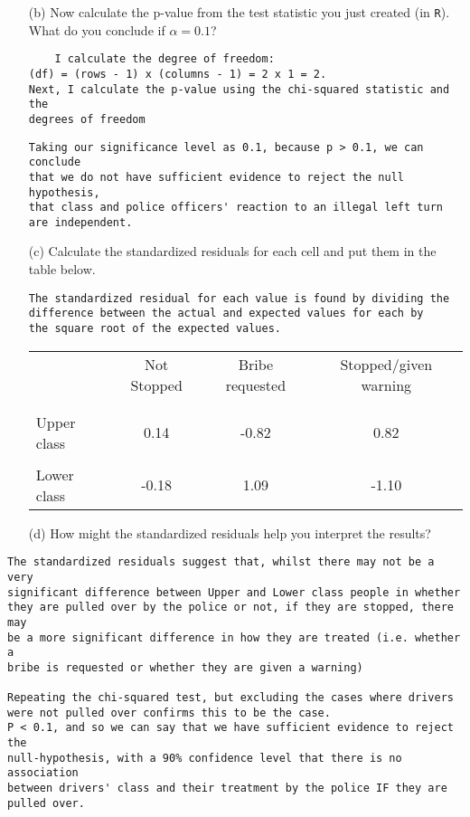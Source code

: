 \documentclass[12pt,letterpaper]{article}
\begin{document}
\begin{enumerate}
	\item [(b)]
	Now calculate the p-value from the test statistic you just created (in \texttt{R}). What do you conclude if $\alpha = 0.1$?\\
\begin{verbatim}
	I calculate the degree of freedom:
(df) = (rows - 1) x (columns - 1) = 2 x 1 = 2.
Next, I calculate the p-value using the chi-squared statistic and the
degrees of freedom
\end{verbatim}

\begin{verbatim}
Taking our significance level as 0.1, because p > 0.1, we can conclude
that we do not have sufficient evidence to reject the null hypothesis,
that class and police officers' reaction to an illegal left turn are independent.
\end{verbatim}
  	
	\item [(c)] Calculate the standardized residuals for each cell and put them in the table below.
	\vspace{1cm}
\begin{verbatim}
The standardized residual for each value is found by dividing the
difference between the actual and expected values for each by
the square root of the expected values.
\end{verbatim}	

\begin{table}[h]
		\centering
		\begin{tabular}{l | c c c }
			& Not Stopped & Bribe requested & Stopped/given warning \\
			\\[-1.8ex] 
			\hline \\[-1.8ex]
			Upper class  & 0.14 & -0.82 & 0.82 \\
			\\ Lower class & -0.18  & 1.09  & -1.10  \\
			
		\end{tabular}
	\end{table}
	\item [(d)] How might the standardized residuals help you interpret the results?
\end{enumerate}
\begin{verbatim}
The standardized residuals suggest that, whilst there may not be a very
significant difference between Upper and Lower class people in whether
they are pulled over by the police or not, if they are stopped, there may
be a more significant difference in how they are treated (i.e. whether a
bribe is requested or whether they are given a warning)

Repeating the chi-squared test, but excluding the cases where drivers
were not pulled over confirms this to be the case.
P < 0.1, and so we can say that we have sufficient evidence to reject the
null-hypothesis, with a 90% confidence level that there is no association
between drivers' class and their treatment by the police IF they are pulled over.
\end{verbatim}
\end{document}
